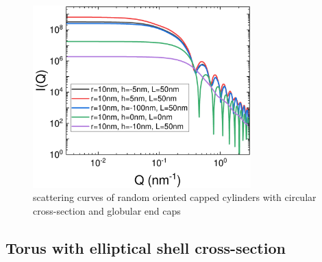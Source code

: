 \begin{figure}[htb]
\begin{center}
\includegraphics[width=0.75\textwidth]{../images/form_factor/cylindrical_obj/capped_cylinder_IQ.pdf}
\end{center}
\caption{scattering curves of random oriented capped cylinders with circular cross-section and globular end caps}
\label{fig:capped_cylinder_IQ}
\end{figure}



\clearpage

\subsection{Torus with elliptical shell cross-section}  \cite{Kawaguchi2001,Forster1999}
\label{sect:Torus}
\hspace{1pt}\\

